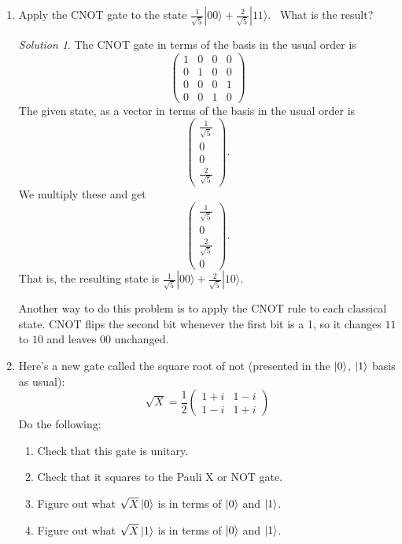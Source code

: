 \documentclass{article}
\theoremstyle{plain}
\theoremstyle{definition}
\theoremstyle{remark}
\newtheorem*{solution}{Solution}
\numberwithin{theorem}{section}
\begin{document}
\begin{enumerate}
\item Apply the CNOT gate to the state $\frac{1}{\sqrt{5}}|00\rangle + \frac{2}{\sqrt{5}} |11 \rangle$.  What is the result?

\begin{solution}
The CNOT gate in terms of the basis in the usual order is
\[
\begin{pmatrix}
1 & 0 & 0 & 0 \\
0 & 1 & 0 & 0 \\
0 & 0 & 0 & 1 \\
0 & 0 & 1 & 0
\end{pmatrix}
\]
The given state, as a vector in terms of the basis in the usual order is
\[
\begin{pmatrix}
    \frac{1}{\sqrt{5}} \\
    0 \\
    0 \\
    \frac{2}{\sqrt{5}} 
\end{pmatrix}.
\]
We multiply these and get
\[
\begin{pmatrix}
    \frac{1}{\sqrt{5}} \\
    0 \\
    \frac{2}{\sqrt{5}}  \\
    0 
\end{pmatrix}.
\]
That is, the resulting state is
$\frac{1}{\sqrt{5}}|00\rangle + \frac{2}{\sqrt{5}} |10 \rangle$.

Another way to do this problem is to apply the CNOT rule to each classical state.  CNOT flips the second bit whenever the first bit is a 1, so it changes $11$ to $10$ and leaves $00$ unchanged.
\end{solution}

	\item Here's a new gate called the square root of not (presented in the $\ket{0}$, $\ket{1}$ basis as usual):
		\[
			\sqrt{X} = \frac{1}{2} \begin{pmatrix}
				1+i & 1-i \\
				1-i & 1+i 
			\end{pmatrix}
		\]
		Do the following:
		\begin{enumerate}
			\item Check that this gate is unitary.
			\item Check that it squares to the Pauli X or NOT gate.
			\item Figure out what $\sqrt{X}\ket{0}$ is in terms of $\ket{0}$ and $\ket{1}$.
			\item Figure out what $\sqrt{X}\ket{1}$ is in terms of $\ket{0}$ and $\ket{1}$.
		\end{enumerate}


\end{enumerate}
\end{document}

